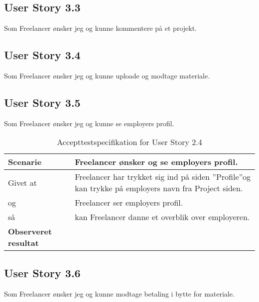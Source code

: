 \subsection{User Story 3.3}
Som Freelancer ønsker jeg og kunne kommentere på et projekt.

\subsection{User Story 3.4}
Som Freelancer ønsker jeg og kunne uploade og modtage materiale.

\subsection{User Story 3.5}
Som Freelancer ønsker jeg og kunne se employers profil.

\begin{table}[H]
	\centering
	\caption{Accepttestspecifikation for User Story 2.4 }
	\begin{tabular}{p{8cm}|p{8cm}}
		\hline
		\textbf{Scenarie} & Freelancer ønsker og se employers profil.\\[10px]
		\hline
		Givet at & Freelancer har trykket sig ind på siden ''Profile''og kan trykke på employers navn fra Project siden.\\
        \hline
        og & Freelancer ser employers profil.\\
        \hline
        så &  kan Freelancer danne et overblik over employeren.\\
		\hline
		\rowcolor{white}
		\textbf{Observeret resultat} & \\
		\hline
	\end{tabular}
\end{table}

\subsection{User Story 3.6}
Som Freelancer ønsker jeg og kunne modtage betaling i bytte for materiale.
